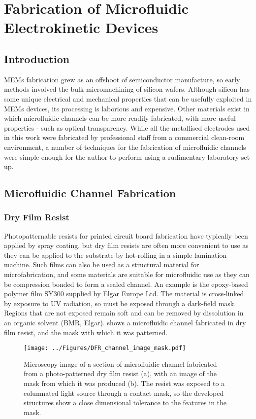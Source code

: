 \chapter{Fabrication of Microfluidic Electrokinetic Devices} 
\label{Chapter:Fabrication}

\section{Introduction}
MEMs fabrication grew as an offshoot of semiconductor manufacture, so early methods involved the bulk micromachining of silicon wafers. Although silicon has some unique electrical and mechanical properties that can be usefully exploited in MEMs devices, its processing is laborious and expensive. Other materials exist in which microfluidic channels can be more readily fabricated, with more useful properties - such as optical transparency. While all the metallised electrodes used in this work were fabricated by professional staff from a commercial clean-room environment, a number of techniques for the fabrication of microfluidic channels were simple enough for the author to perform using a rudimentary laboratory set-up.


\section{Microfluidic Channel Fabrication}
\subsection{Dry Film Resist}

Photopatternable resists for printed circuit board fabrication have typically been applied by spray coating, but dry film resists are often more convenient to use as they can be applied to the substrate by hot-rolling in a simple lamination machine. Such films can also be used as a structural material for microfabrication, and some materials are suitable for microfluidic use as they can be compression bonded to form a sealed channel. An example is the epoxy-based polymer film SY300 supplied by Elgar Europe Ltd. The material is cross-linked by exposure to UV radiation, so must be exposed through a dark-field mask. Regions that are not exposed remain soft and can be removed by dissolution in an organic solvent (BMR, Elgar).  shows a microfluidic channel fabricated in dry film resist, and the mask with which it was patterned.

\begin{figure}
	\centering
		\texttt{[image: ../Figures/DFR\_channel\_image\_mask.pdf]}
	\caption[Microfluidic channel fabricated from dry film resist, with the mask from which it was produced.]{Microscopy image of a section of microfluidic channel fabricated from a photo-patterned dry film resist (a), with an image of the mask from which it was produced (b). The resist was exposed to a columnated light source through a contact mask, so the developed structures show a close dimensional tolerance to the features in the mask.}
	\label{fig:DFR_channel_image_mask}
\end{figure}

